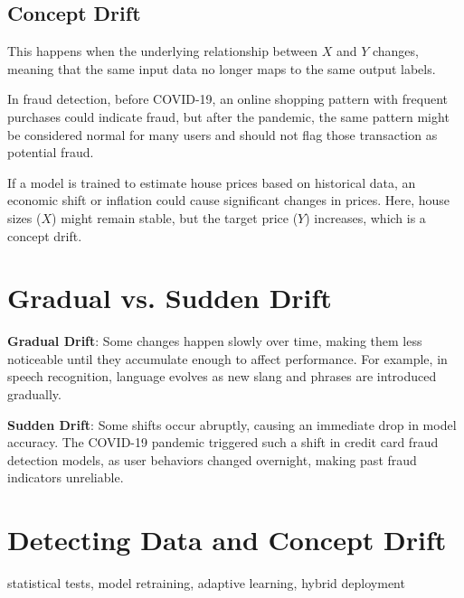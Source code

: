 \documentclass[12pt,openany]{book}
\begin{document}
\subsection{Concept Drift}

This happens when the underlying relationship between \(X\) and \(Y\) changes, meaning that the same input data no longer maps to the same output labels.
    
\begin{examplebox}
     In fraud detection, before COVID-19, an online shopping pattern with frequent purchases could indicate fraud, but after the pandemic, the same pattern might be considered normal for many users and should not flag those transaction as potential fraud.
\end{examplebox}

\begin{examplebox}
     If a model is trained to estimate house prices based on historical data, an economic shift or inflation could cause significant changes in prices. Here, house sizes (\(X\)) might remain stable, but the target price (\(Y\)) increases, which is a concept drift.
\end{examplebox}



\section{Gradual vs. Sudden Drift}

\textbf{Gradual Drift}: Some changes happen slowly over time, making them less noticeable until they accumulate enough to affect performance. For example, in speech recognition, language evolves as new slang and phrases are introduced gradually. \newline

\textbf{Sudden Drift}: Some shifts occur abruptly, causing an immediate drop in model accuracy. The COVID-19 pandemic triggered such a shift in credit card fraud detection models, as user behaviors changed overnight, making past fraud indicators unreliable.



\section{Detecting Data and Concept Drift}

\begin{keywordsbox}
statistical tests, model retraining, adaptive learning, hybrid deployment
\end{keywordsbox}
\end{document}
